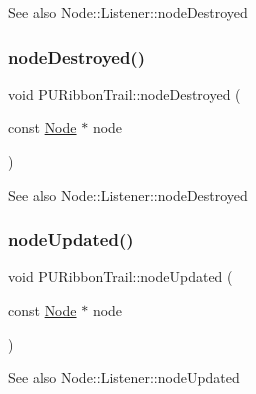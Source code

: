 \begin{DoxySeeAlso}{See also}
Node\+::\+Listener\+::node\+Destroyed 
\end{DoxySeeAlso}
\mbox{\label{classPURibbonTrail_a2330a097fe804b197556eff5bce345ec}} 
\subsubsection{\texorpdfstring{node\+Destroyed()}{nodeDestroyed()}\hspace{0.1cm}{\footnotesize\ttfamily [2/2]}}
{\footnotesize\ttfamily void P\+U\+Ribbon\+Trail\+::node\+Destroyed (\begin{DoxyParamCaption}\item[{const \hyperlink{classNode}{Node} $\ast$}]{node }\end{DoxyParamCaption})}

\begin{DoxySeeAlso}{See also}
Node\+::\+Listener\+::node\+Destroyed 
\end{DoxySeeAlso}
\mbox{\label{classPURibbonTrail_a67db1906af616c173f790428bd98f318}} 
\subsubsection{\texorpdfstring{node\+Updated()}{nodeUpdated()}\hspace{0.1cm}{\footnotesize\ttfamily [1/2]}}
{\footnotesize\ttfamily void P\+U\+Ribbon\+Trail\+::node\+Updated (\begin{DoxyParamCaption}\item[{const \hyperlink{classNode}{Node} $\ast$}]{node }\end{DoxyParamCaption})}

\begin{DoxySeeAlso}{See also}
Node\+::\+Listener\+::node\+Updated 
\end{DoxySeeAlso}
\mbox{\label{classPURibbonTrail_a67db1906af616c173f790428bd98f318}} 
